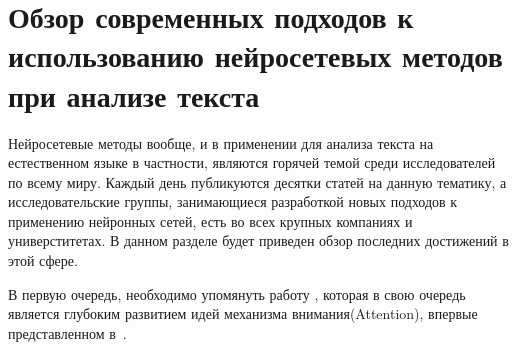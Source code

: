 \section{Обзор современных подходов к использованию нейросетевых методов при анализе текста} \label{literature}

\par Нейросетевые методы вообще, и в применении для анализа текста на естественном языке в частности, являются горячей темой среди исследователей по всему миру. Каждый день публикуются десятки статей на данную тематику, а исследовательские группы, занимающиеся разработкой новых подходов к применению нейронных сетей, есть во всех крупных компаниях и универститетах. В данном разделе будет приведен обзор последних достижений в этой сфере.

\par В первую очередь, необходимо упомянуть работу \cite{attn-all-need}, которая в свою очередь является глубоким развитием идей механизма внимания(Attention), впервые представленном в~\cite{attn-original}.

\clearpage
